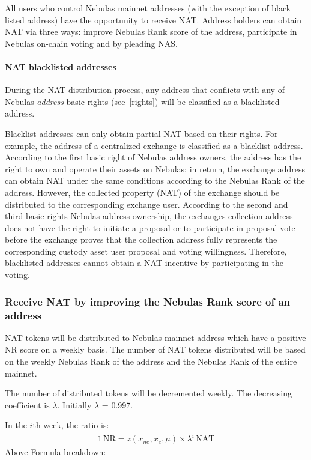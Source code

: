 All users who control Nebulas mainnet addresses (with the exception of black listed address) have the opportunity to receive NAT. Address holders can obtain NAT via three ways: improve Nebulas Rank score of the address, participate in Nebulas on-chain voting and by pleading NAS.


\paragraph{NAT blacklisted addresses}

During the NAT distribution process, any address that conflicts with any of
Nebulas \emph{address} basic rights (see~\ref{rights}) will be classified as a blacklisted address.

Blacklist addresses can only obtain partial NAT based on their rights. For example, the address of a centralized exchange is classified as a blacklist address. According to the first basic right of Nebulas address owners, the address has the right to own and operate their assets on Nebulas; in return, the exchange address can obtain NAT under the same conditions according to the Nebulas Rank of the address. However, the collected property (NAT) of the exchange should be distributed to the corresponding exchange user. According to the second and third basic rights Nebulas address ownership, the exchanges collection address does not have the right to initiate a proposal or to participate in proposal vote before the exchange proves that the collection address fully represents the corresponding custody asset user proposal and voting willingness. Therefore, blacklisted addresses cannot obtain a NAT incentive by participating in the voting.


\subsubsection{Receive NAT by improving the Nebulas Rank score of an address}

NAT tokens will be distributed to Nebulas mainnet address which have a positive NR score on a weekly basis. The number of NAT tokens distributed will be based on the weekly Nebulas Rank of the address and the Nebulas Rank of the entire mainnet.

The number of distributed tokens will be decremented weekly. The decreasing coefficient is $\lambda$. Initially $\lambda$ = 0.997.

In the $i$th week, the ratio is:
\begin{align}
1\,\text{NR}=z(x_{ne},x_{e},\mu)\times\lambda^{i}\,\text{NAT}
\end{align}
Above Formula breakdown:

